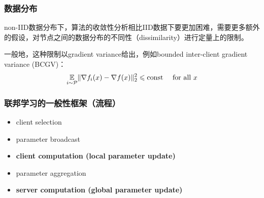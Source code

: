 
\begin{frame}
\frametitle{数据分布}

non-IID数据分布下，算法的收敛性分析相比IID数据下要更加困难，需要更多额外的假设，对节点之间的数据分布的不同性（dissimilarity）进行定量上的限制。

\vspace{1.5em}

一般地，这种限制以gradient variance给出，例如bounded inter-client gradient variance (BCGV)：
$$\operatorname*{\mathbb{E}}\limits_{i \sim {\mathcal{P}}} \lVert \nabla f_i(x) - \nabla f(x) \rVert_2^2 \leqslant \text{const} \quad \text{ for all } x$$

\end{frame}


\begin{frame}
\frametitle{联邦学习的一般性框架（流程）}

\begin{itemize}
    \item client selection
    \vspace{0.5em}
    \item parameter broadcast
    \vspace{0.5em}
    \item {\large \bfseries client computation (local parameter update)}
    \vspace{0.5em}
    \item parameter aggregation
    \vspace{0.5em}
    \item {\large \bfseries server computation (global parameter update)}
\end{itemize}

\end{frame}



